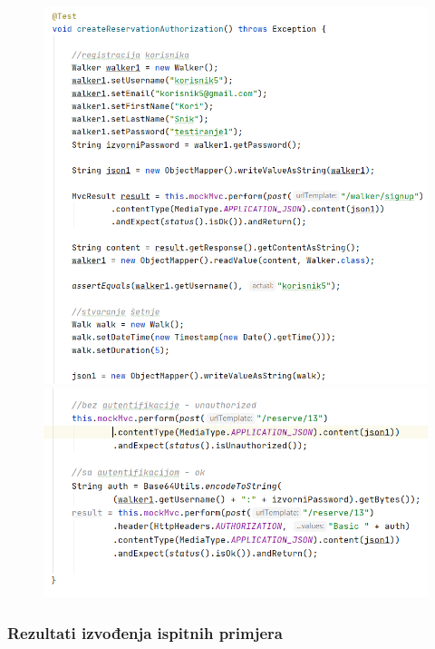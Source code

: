 			
			\begin{figure}[H]
				\hspace*{-0.18in}
				\includegraphics[scale=0.75]{slike/walker4.1.PNG}
				\hspace*{-0.4in}
				\includegraphics[scale=0.75]{slike/walker4.2.PNG} %
				\centering
			\end{figure}
		
		
			\subsubsection{Rezultati izvođenja ispitnih primjera }
			
